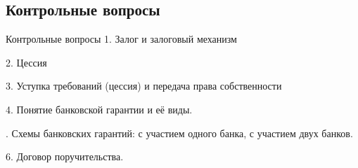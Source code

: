 \documentclass[_Banking_p3.tex]{subfiles}
\begin{document}
\subsection{Контрольные вопросы}
\begin{frame}[ allowframebreaks ]{Контрольные вопросы}
1. Залог и залоговый механизм

2. Цессия

3. Уступка требований (цессия) и передача права собственности

4. Понятие банковской гарантии и её виды.

. Схемы банковских гарантий: с участием одного банка, с участием двух банков.

6. Договор поручительства.
\end{frame}

\end{document}
